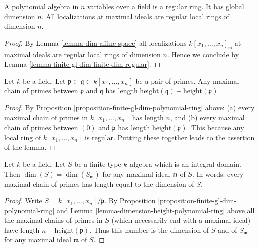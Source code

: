 \begin{proposition}
\label{proposition-finite-gl-dim-polynomial-ring}
A polynomial algebra in $n$ variables over a field is a regular ring.
It has global dimension $n$. All localizations at maximal ideals
are regular local rings of dimension $n$.
\end{proposition}

\begin{proof}
By Lemma \ref{lemma-dim-affine-space}
all localizations $k[x_1,\ldots,x_n]_{\mathfrak m}$
at maximal ideals are regular local rings of dimension $n$. Hence
we conclude by Lemma \ref{lemma-finite-gl-dim-finite-dim-regular}.
\end{proof}

\begin{lemma}
\label{lemma-dimension-height-polynomial-ring}
Let $k$ be a field.
Let $\mathfrak p \subset \mathfrak q \subset k[x_1, \ldots, x_n]$
be a pair of primes.
Any maximal chain of primes between $\mathfrak p$ and $\mathfrak q$
has length $\text{height}(\mathfrak q) - \text{height}(\mathfrak p)$.
\end{lemma}

\begin{proof}
By Proposition \ref{proposition-finite-gl-dim-polynomial-ring} above:
(a) every maximal chain of primes in $k[x_1, \ldots, x_n]$
has length $n$, and (b) every maximal chain of primes
between $(0)$ and $\mathfrak p$ has length $\text{height}(\mathfrak p)$.
This because any local ring of $k[x_1, \ldots, x_n]$ is regular.
Putting these together leads to the assertion of the lemma.
\end{proof}

\begin{lemma}
\label{lemma-dimension-spell-it-out}
Let $k$ be a field.
Let $S$ be a finite type $k$-algebra which is an integral domain.
Then $\dim(S) = \dim(S_{\mathfrak m})$ for any maximal
ideal $\mathfrak m$ of $S$. In words: every maximal chain
of primes has length equal to the dimension of $S$.
\end{lemma}

\begin{proof}
Write $S = k[x_1, \ldots, x_n]/\mathfrak p$.
By Proposition \ref{proposition-finite-gl-dim-polynomial-ring} and
Lemma \ref{lemma-dimension-height-polynomial-ring} above
all the maximal chains of primes in $S$ (which necessarily end
with a maximal ideal) have length $n - \text{height}(\mathfrak p)$.
Thus this number is the dimension of $S$ and of $S_{\mathfrak m}$
for any maximal ideal $\mathfrak m$ of $S$.
\end{proof}


